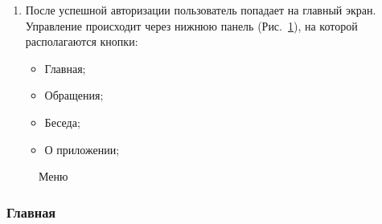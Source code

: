\documentclass{../includes/TechDoc}
\begin{document}
\begin{enumerate}
        \item После успешной авторизации пользователь попадает на главный экран.
        Управление происходит через нижнюю панель (Рис.~\ref{fig:menu}), на которой располагаются кнопки:
        \begin{itemize}[noitemsep]
            \item Главная;
            \item Обращения;
            \item Беседа;
            \item О приложении;
        \end{itemize}
    \end{enumerate}

    \begin{figure}[ht]
        \centering
        \caption{Меню}
        \label{fig:menu}
    \end{figure}

    \clearpage

    \subsubsection{Главная}
\end{document}
